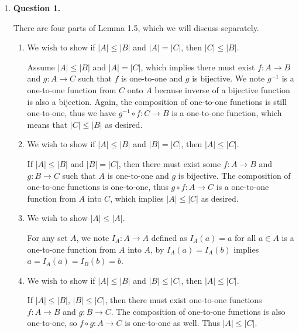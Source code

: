 \documentclass{article}
\begin{document}
	\begin{enumerate}
		\item \textbf{Question 1.}
			\medskip
			
			There are four parts of Lemma 1.5, which we will discuss separately.
			
			\medskip
			\begin{enumerate}
				\item We wish to show if $|A| \leq |B|$ and $|A| = |C|$, then $|C| \leq |B|$.
				
				\medskip
				Assume $|A| \leq |B|$ and $|A| = |C|$, which implies there must exist $f: A \xrightarrow{} B$ and $g: A \xrightarrow{} C$ such that $f$ is one-to-one and $g$ is bijective. We note $g^{-1}$ is a one-to-one function from $C$ onto $A$ because inverse of a bijective function is also a bijection. Again, the composition of one-to-one functions is still one-to-one, thus we have $g^{-1} \circ f: C \xrightarrow{} B$ is a one-to-one function, which means that $|C| \leq |B|$ as desired.
				
				\item We wish to show if $|A| \leq |B|$ and $|B| = |C|$, then $|A| \leq |C|$.
				\medskip
				
				If $|A| \leq |B|$ and $|B| = |C|$, then there must exist some $f: A \xrightarrow{} B$ and $g: B \xrightarrow{} C$ such that $A$ is one-to-one and $g$ is bijective. The composition of one-to-one functions is one-to-one, thus $g \circ f: A \xrightarrow{} C$ is a one-to-one function from $A$ into $C$, which implies $|A| \leq |C|$ as desired.
				
				\item We wish to show $|A| \leq |A|$.
				\medskip
				
				For any set $A$, we note $I_{A}: A \xrightarrow{} A$ defined as $I_{A}(a) = a$ for all $a \in A$ is a one-to-one function from $A$ into $A$, by $I_{A}(a) = I_{A}(b)$ implies $a = I_{A}(a) = I_{B}(b) = b$.
				 
				\item We wish to show if $|A| \leq |B|$ and $|B| \leq |C|$, then $|A| \leq |C|$. 
				
				\medskip
				If $|A| \leq |B|$, $|B| \leq |C|$, then there must exist one-to-one functions $f: A \xrightarrow{} B$ and $g: B \xrightarrow{} C$. The composition of one-to-one functions is also one-to-one, so $f \circ g: A \xrightarrow{} C$ is one-to-one as well. Thus $|A| \leq |C|$.
				
			\end{enumerate}
		

\end{enumerate}
\end{document}
